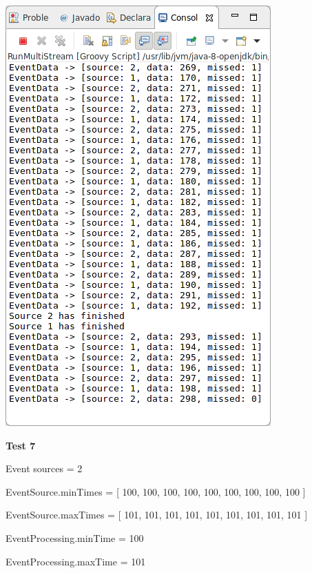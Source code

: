 \includegraphics[width=\textwidth/2]{img/screenshots/9-2-6.png}

\textbf{Test 7}

Event sources = 2

EventSource.minTimes = [ 100, 100, 100, 100, 100, 100, 100, 100, 100 ]

EventSource.maxTimes = [ 101, 101, 101, 101, 101, 101, 101, 101, 101 ]

EventProcessing.minTime = 100

EventProcessing.maxTime = 101

